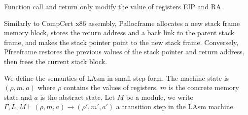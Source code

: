 Function call and return only modify the value of registers \textsf{EIP} and \textsf{RA}.

Similarly to CompCert x86 assembly, \textsf{Pallocframe} allocates a
new stack frame memory block, stores the return address and a back
link to the parent stack frame, and makes the stack pointer point to
the new stack frame. Conversely, \textsf{Pfreeframe} restores the
previous values of the stack pointer and return address, then frees
the current stack block.

We define the semantics of LAsm in small-step form. The machine
state is $(\rho, m, a)$ where $\rho$ contains the values of registers,
$m$ is the concrete memory state and $a$ is the abstract state.  Let
$M$ be a module, we write $\Gamma, L, M \vdash (\rho, m, a)
\rightarrow (\rho', m', a')$ a transition step in the LAsm machine.

